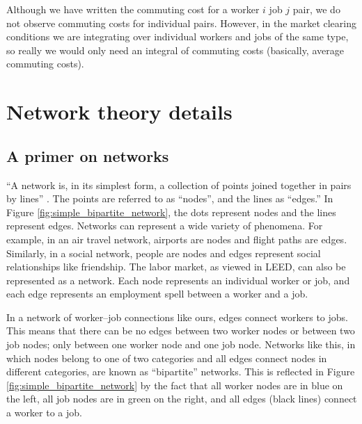\documentclass[12pt]{article}
\theoremstyle{definition}
\theoremstyle{plain}
\begin{document}
Although we have written the commuting cost for a worker $i$ job $j$ pair, we do not observe commuting costs for individual pairs. However, in the market clearing conditions we are integrating over individual workers and jobs of the same type, so really we would only need an integral of commuting costs (basically, average commuting costs).



%


\section{Network theory details}

\label{app:network_theory}

\subsection{A primer on networks}


``A network is, in its simplest form, a collection of points joined together in pairs by lines'' \citep{Newman2018}. The points are referred to as ``nodes'', and the lines as ``edges.''  In Figure \ref{fig:simple_bipartite_network}, the dots represent nodes and the lines represent edges. Networks can represent a wide variety of phenomena. For example, in an air travel network, airports are nodes and flight paths are edges. Similarly, in a social network, people are nodes and edges represent social relationships like friendship. The labor market, as viewed in LEED, can also be represented as a network. Each node represents an individual worker or job, and each edge represents an employment spell between a worker and a job. 

In a network of worker--job connections like ours, edges connect workers to jobs. This means that there can be no edges between two worker nodes or between two job nodes; only between one worker node and one job node. Networks like this, in which nodes belong to one of two categories and all edges connect nodes in different categories, are known as ``bipartite'' networks. This is reflected in Figure \ref{fig:simple_bipartite_network} by the fact that all worker nodes are in blue on the left, all job nodes are in green on the right, and all edges (black lines) connect a worker to a job. 
\end{document}
